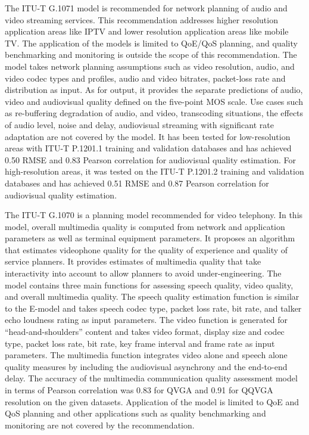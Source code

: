 \documentclass[journal]{IEEEtran}
\begin{document}
The ITU-T G.1071 \cite{itut2015G.1071} model is recommended for network planning of audio and video streaming services. This recommendation addresses higher resolution application areas like IPTV and lower resolution application areas like mobile TV. The application of the models is limited to QoE/QoS planning, and quality benchmarking and monitoring is outside the scope of this recommendation. The model takes network planning assumptions such as video resolution, audio, and video codec types and profiles, audio and video bitrates, packet-loss rate and distribution as input. As for output, it provides the separate predictions of audio, video and audiovisual quality defined on the five-point MOS scale. Use cases such as re-buffering degradation of audio, and video, transcoding situations, the effects of audio level, noise and delay, audiovisual streaming with significant rate adaptation are not covered by the model. It has been tested for low-resolution areas with ITU-T P.1201.1 training and validation databases and has achieved 0.50 RMSE and 0.83 Pearson correlation for audiovisual quality estimation. For high-resolution areas, it was tested on the ITU-T P.1201.2 training and validation databases and has achieved 0.51 RMSE and 0.87 Pearson correlation for audiovisual quality estimation.

The ITU-T G.1070 \cite{itut2012G.1070} is a planning model recommended for video telephony. In this model, overall multimedia quality is computed from network and application parameters as well as terminal equipment parameters. It proposes an algorithm that estimates videophone quality for the quality of experience and quality of service planners. It provides estimates of multimedia quality that take interactivity into account to allow planners to avoid under-engineering. The model contains three main functions for assessing speech quality, video quality, and overall multimedia quality. The speech quality estimation function is similar to the E-model \cite{rec2003g} and takes speech codec type, packet loss rate, bit rate, and talker echo loudness rating as input parameters. The video function is generated for “head-and-shoulders” content and takes video format, display size and codec type, packet loss rate, bit rate, key frame interval and frame rate as input parameters. The multimedia function integrates video alone and speech alone quality measures by including the audiovisual asynchrony and the end-to-end delay. The accuracy of the multimedia communication quality assessment model in terms of Pearson correlation was 0.83 for QVGA and 0.91 for QQVGA resolution on the given datasets. Application of the model is limited to QoE and QoS planning and other applications such as quality benchmarking and monitoring are not covered by the recommendation.
\end{document}
